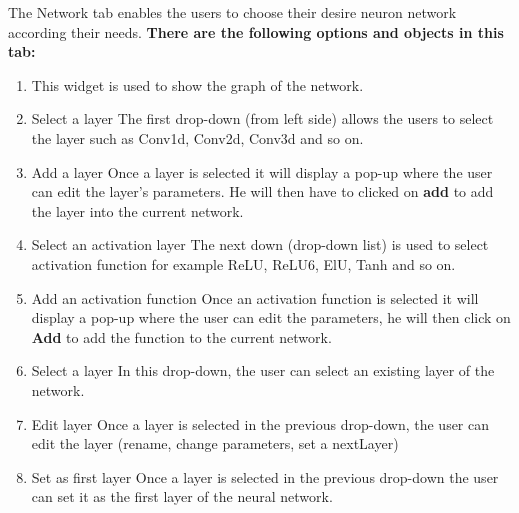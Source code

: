 \newpage
The Network tab enables the users to choose their desire neuron network according their needs. \newline 
\textbf{There are the following options and objects in this tab:}
\begin{enumerate}
    \item This widget is used to show the graph of the network.
    \item Select a layer \newline
        The first drop-down (from left side) allows the users to select the layer such as Conv1d, Conv2d, Conv3d and so on.
    \item Add a layer \newline
    Once a layer is selected it will display a pop-up where the user can edit the layer's parameters.
    He will then have to clicked on \textbf{add} to add the layer into the current network.
    \item Select an activation layer \newline
        The next down (drop-down list) is used to select activation function for example ReLU, ReLU6, ElU, Tanh and so on.
    \item Add an activation function \newline
    Once an activation function is selected it will display a pop-up where the user can edit the parameters, he will then click on \textbf{Add} to add the function to the current network.
    \item Select a layer\newline
    In this drop-down, the user can select an existing layer of the network.
    \item Edit layer\newline
    Once a layer is selected in the previous drop-down, the user can edit the layer (rename, change parameters, set a nextLayer)
    \item Set as first layer\newline
    Once a layer is selected in the previous drop-down the user can set it as the first layer of the neural network.
    

\end{enumerate}
